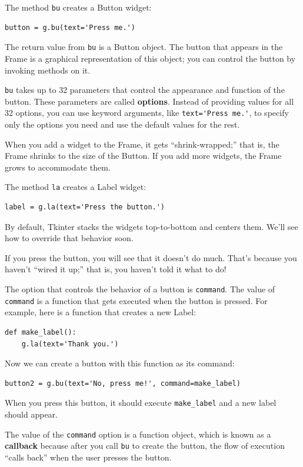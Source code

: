 \documentclass[10pt]{book}
\begin{document}
The method {\tt bu} creates a Button widget:

\begin{verbatim}
button = g.bu(text='Press me.')
\end{verbatim}
%
The return value from {\tt bu} is a Button object.  The button
that appears in the Frame is a graphical representation of this
object; you can control the button by invoking methods on it.

{\tt bu} takes up to 32 parameters that control the appearance
and function of the button.  These parameters are called
{\bf options}.  Instead of providing values for all 32 options,
you can use keyword arguments, like \verb"text='Press me.'",
to specify only the options you need and use the default
values for the rest.

When you add a widget to the Frame, it gets ``shrink-wrapped;''
that is, the Frame shrinks to the size of the Button.  If you
add more widgets, the Frame grows to accommodate them.

The method {\tt la} creates a Label widget:

\begin{verbatim}
label = g.la(text='Press the button.')
\end{verbatim}
%
By default, Tkinter stacks the widgets top-to-bottom and centers
them.  We'll see how to override that behavior soon.

If you press the button, you will see that it doesn't do much.
That's because you haven't ``wired it up;'' that is, you haven't
told it what to do!

The option that controls the behavior of a button is {\tt command}.
The value of {\tt command} is a function that gets executed when
the button is pressed.  For example, here is a function that creates
a new Label:

\begin{verbatim}
def make_label():
    g.la(text='Thank you.')
\end{verbatim}
%
Now we can create a button with this function as its command:

\begin{verbatim}
button2 = g.bu(text='No, press me!', command=make_label)
\end{verbatim}
%
When you press this button, it should execute \verb"make_label"
and a new label should appear.

The value of the {\tt command} option
is a function object, which is known as a {\bf callback} because
after you call {\tt bu} to create the button, the flow of execution
``calls back'' when the user presses the button.
\end{document}
